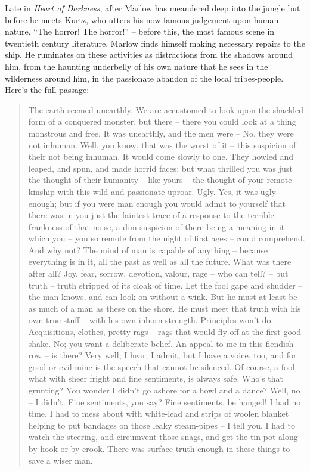 \documentclass[10pt,DIV09,letterpaper,oneside,headsepline]{scrreprt}
\begin{document}
Late in \textit{Heart of Darkness}, after Marlow has meandered deep
into the jungle but before he meets Kurtz, who utters his now-famous
judgement upon human nature, ``The horror! The horror!'' -- before
this, the most famous scene in twentieth century literature, Marlow
finds himself making necessary repairs to the ship. He ruminates on
these activities as distractions from the shadows around him, from the
haunting underbelly of his own nature that he sees in the wilderness
around him, in the passionate abandon of the local tribes-people.
Here's the full passage:
\begin{quotation}
The earth seemed unearthly. We are accustomed to look upon the
shackled form of a conquered monster, but there -- there you could
look at a thing monstrous and free. It was unearthly, and the men
were -- No, they were not inhuman. Well, you know, that was the
worst of it -- this suspicion of their not being inhuman. It would
come slowly to one. They howled and leaped, and spun, and made
horrid faces; but what thrilled you was just the thought of their
humanity -- like yours -- the thought of your remote kinship with
this wild and passionate uproar. Ugly. Yes, it was ugly enough; but
if you were man enough you would admit to yourself that there was in
you just the faintest trace of a response to the terrible frankness
of that noise, a dim suspicion of there being a meaning in it which
you -- you so remote from the night of first ages -- could
comprehend. And why not? The mind of man is capable of anything --
because everything is in it, all the past as well as all the future.
What was there after all? Joy, fear, sorrow, devotion, valour, rage
-- who can tell? -- but truth -- truth stripped of its cloak of
time. Let the fool gape and shudder -- the man knows, and can look
on without a wink. But he must at least be as much of a man as these
on the shore. He must meet that truth with his own true stuff --
with his own inborn strength. Principles won't do. Acquisitions,
clothes, pretty rags -- rags that would fly off at the first good
shake. No; you want a deliberate belief. An appeal to me in this
fiendish row -- is there? Very well; I hear; I admit, but I have a
voice, too, and for good or evil mine is the speech that cannot be
silenced. Of course, a fool, what with sheer fright and fine
sentiments, is always safe. Who's that grunting? You wonder I didn't
go ashore for a howl and a dance? Well, no -- I didn't. Fine
sentiments, you say? Fine sentiments, be hanged! I had no time. I
had to mess about with white-lead and strips of woolen blanket
helping to put bandages on those leaky steam-pipes -- I tell you. I
had to watch the steering, and circumvent those snags, and get the
tin-pot along by hook or by crook. There was surface-truth enough in
these things to save a wiser man.
\end{quotation}
\end{document}

